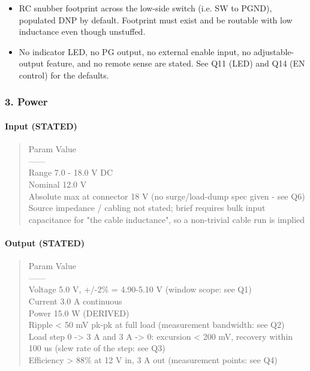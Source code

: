 \documentclass[11pt,a4paper]{article}
\begin{document}
\begin{itemize}
\item RC snubber footprint across the low-side switch (i.e. SW to PGND), populated DNP by
default. Footprint must exist and be routable with low inductance even though unstuffed.
\item No indicator LED, no PG output, no external enable input, no adjustable-output feature,
and no remote sense are stated. See Q11 (LED) and Q14 (EN control) for the defaults.
\end{itemize}
\subsubsection*{3. Power}
\paragraph*{Input (STATED)}
\begin{quote}\small\ttfamily\raggedright
\textbar{} Param \textbar{} Value \textbar{}\\
\textbar{}---\textbar{}---\textbar{}\\
\textbar{} Range \textbar{} 7.0 - 18.0 V DC \textbar{}\\
\textbar{} Nominal \textbar{} 12.0 V \textbar{}\\
\textbar{} Absolute max at connector \textbar{} 18 V (no surge/load-dump spec given - see Q6) \textbar{}\\
\textbar{} Source impedance / cabling \textbar{} not stated; brief requires bulk input capacitance for "the cable inductance", so a non-trivial cable run is implied \textbar{}
\end{quote}
\paragraph*{Output (STATED)}
\begin{quote}\small\ttfamily\raggedright
\textbar{} Param \textbar{} Value \textbar{}\\
\textbar{}---\textbar{}---\textbar{}\\
\textbar{} Voltage \textbar{} 5.0 V, +/-2\% = 4.90-5.10 V (window scope: see Q1) \textbar{}\\
\textbar{} Current \textbar{} 3.0 A continuous \textbar{}\\
\textbar{} Power \textbar{} 15.0 W (DERIVED) \textbar{}\\
\textbar{} Ripple \textbar{} \textless{} 50 mV pk-pk at full load (measurement bandwidth: see Q2) \textbar{}\\
\textbar{} Load step \textbar{} 0 -\textgreater{} 3 A and 3 A -\textgreater{} 0: excursion \textless{} 200 mV, recovery within 100 us (slew rate of the step: see Q3) \textbar{}\\
\textbar{} Efficiency \textbar{} \textgreater{} 88\% at 12 V in, 3 A out (measurement points: see Q4) \textbar{}
\end{quote}
\end{document}
